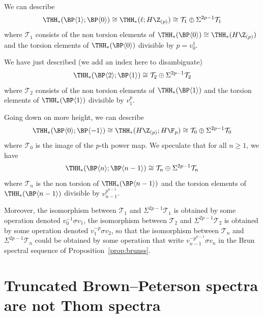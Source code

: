 \begin{remark}
  We can describe
  \begin{equation}
    \THH_*(\BP \langle 1 \rangle; \BP \langle 0 \rangle) \cong \THH_*(\ell; H \Z_{(p)}) \cong \mathcal{T}_1 \oplus \Sigma^{2p - 1} \mathcal{T}_1
  \end{equation}
  where $\mathcal{T}_1$ consists of the non torsion elements of $\THH_*(\BP \langle 0 \rangle) \cong \THH_*(H\Z_{(p)})$ and the torsion elements of $\THH_*(\BP \langle 0 \rangle)$ divisible by $p = v_0^1$.

  We have just described (we add an index here to disambiguate)
  \begin{equation}
    \THH_*(\BP \langle 2 \rangle; \BP \langle 1 \rangle)\cong \mathcal{T}_2 \oplus \Sigma^{2p - 1} \mathcal{T}_2
  \end{equation}
  where $\mathcal{T}_2$ consists of the non torsion elements of $\THH_*(\BP \langle 1 \rangle)$ and the torsion elements of $\THH_*(\BP \langle 1 \rangle)$ divisible by $v_1^p$.

  Going down on more height, we can describe
  \begin{equation}
    \THH_*(\BP \langle 0 \rangle; \BP \langle -1 \rangle) \cong \THH_*(H \Z_{(p)}; H\F_p) \cong \mathcal{T}_0 \oplus \Sigma^{2p - 1} \mathcal{T}_0
  \end{equation}
  where $\mathcal{T}_0$ is the image of the $p$-th power map.
  We speculate that for all $n \geq 1$, we have
  \begin{equation}
    \THH_*(\BP \langle n \rangle; \BP \langle n-1 \rangle) \cong \mathcal{T}_n \oplus \Sigma^{2p - 1} \mathcal{T}_n
  \end{equation}
  where $\mathcal{T}_n$ is the non torsion of $\THH_*(\BP \langle n -1 \rangle)$ and the torsion elements of $\THH_*(\BP \langle n-1 \rangle)$ divisible by $v_{n-1}^{p^{n-1}}$.

  Moreover, the isomorphism between $\mathcal{T}_1$ and $\Sigma^{2p-1} \mathcal{T}_1$ is obtained by some operation  denoted $v_0^{-1} \sigma v_1$, the isomorphism between $\mathcal{T}_2$ and $\Sigma^{2p-1} \mathcal{T}_2$ is obtained by some operation denoted $v_1^{-p} \sigma v_2$, so that the isomorphism between $\mathcal{T}_n$ and $\Sigma^{2p-1} \mathcal{T}_n$ could be obtained by some operation that write $v_{n-1}^{-p^{n-1}} \sigma v_n$ in the Brun spectral sequence of Proposition~\ref{prop:brunss}.
\end{remark}


\section{Truncated Brown--Peterson spectra are not Thom spectra}

